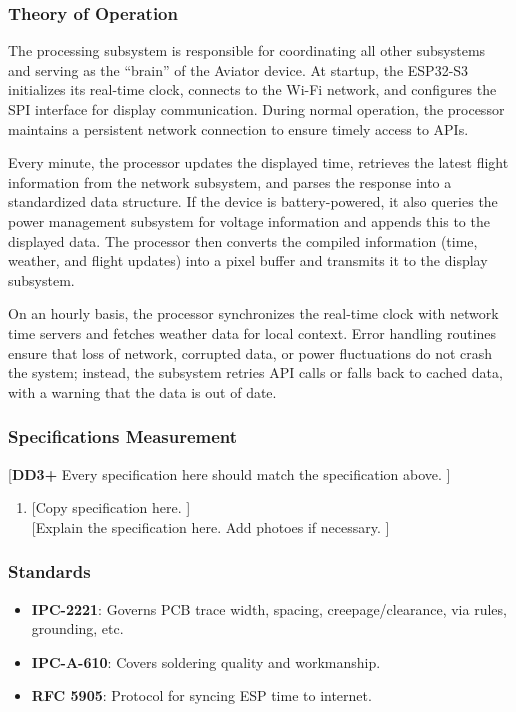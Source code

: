 \subsubsection{Theory of Operation}
The processing subsystem is responsible for
coordinating all other subsystems and serving
as the “brain” of the Aviator device. At startup,
the ESP32-S3 initializes its real-time clock,
connects to the Wi-Fi network, and
configures the SPI interface for display communication.
During normal operation, the processor maintains a
persistent network connection to ensure timely access
to APIs.

Every minute, the processor updates the displayed time,
retrieves the latest flight information from the network
subsystem, and parses the response into a standardized
data structure. If the device is battery-powered, it
also queries the power management subsystem for voltage
information and appends this to the displayed data.
The processor then converts the compiled information
(time, weather, and flight updates) into a pixel buffer
and transmits it to the display subsystem.

On an hourly basis, the processor synchronizes the
real-time clock with network time servers and fetches
weather data for local context. Error handling
routines ensure that loss of network, corrupted data,
or power fluctuations do not crash the system; instead,
the subsystem retries API calls or falls back to cached
data, with a warning that the data is out of date.

\subsubsection{Specifications Measurement}
[\textbf{DD3+} Every specification here should match the specification above. ]
\begin{enumerate}
    \item {[Copy specification here. ]} \\
          {[Explain the specification here. Add photoes if necessary. ]}
\end{enumerate}

\subsubsection{Standards}
\begin{itemize}
    \item \textbf{IPC-2221}: Governs PCB trace width, spacing, creepage/clearance, via rules, grounding, etc.
    \item \textbf{IPC-A-610}: Covers soldering quality and workmanship.
    \item \textbf{RFC 5905}: Protocol for syncing ESP time to internet.
\end{itemize}